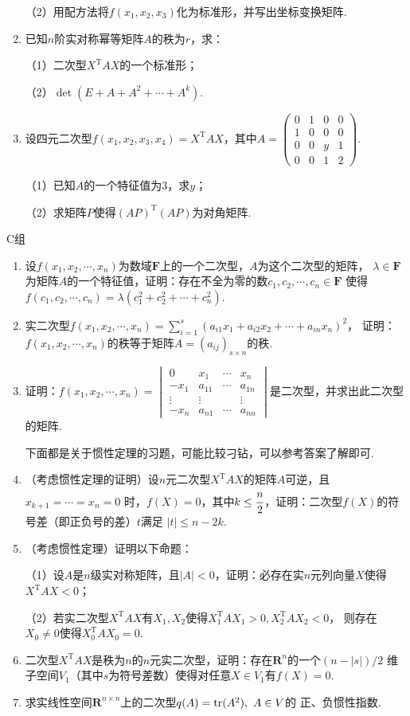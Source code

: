 \begin{enumerate}
	（2）用配方法将$f(x_1,x_2,x_3)$化为标准形，并写出坐标变换矩阵.
	\item 已知$n$阶实对称幂等矩阵$A$的秩为$r$，求：
	
	（1）二次型$X^\mathrm{T}AX$的一个标准形；

	（2）$\det(E+A+A^2+\cdots+A^k)$.
	\item 设四元二次型$f(x_1,x_2,x_3,x_4)=X^\mathrm{T}AX$，其中$A=\begin{pmatrix}
		0 & 1 & 0 & 0 \\ 1 & 0 & 0 & 0 \\ 0 & 0 & y & 1 \\ 0 & 0 & 1 & 2
	\end{pmatrix}$.

	（1）已知$A$的一个特征值为3，求$y$；

	（2）求矩阵$P$使得$(AP)^\mathrm{T}(AP)$为对角矩阵.
\end{enumerate}
\centerline{\heiti C组}

\begin{enumerate}
	\item 设$f(x_1,x_2,\cdots,x_n)$为数域$\mathbf{F}$上的一个二次型，$A$为这个二次型的矩阵，
	$\lambda\in\mathbf{F}$为矩阵$A$的一个特征值，证明：存在不全为零的数$c_1,c_2,\cdots,c_n\in\mathbf{F}$
	使得$f(c_1,c_2,\cdots,c_n)=\lambda(c_1^2+c_2^2+\cdots+c_n^2)$.
	\item 实二次型$f(x_1,x_2,\cdots,x_n)=\sum\limits_{i=1}^{s}(a_{i1}x_1+a_{i2}x_2+\cdots+a_{in}x_n)^2$，
	证明：$f(x_1,x_2,\cdots,x_n)$的秩等于矩阵$A=(a_{ij})_{s\times n}$的秩.
	\item 证明：$f(x_1,x_2,\cdots,x_n)=\begin{vmatrix}
		0 & x_1 & \cdots & x_n \\
		-x_1 & a_{11} & \cdots & a_{1n} \\
		\vdots & \vdots &  & \vdots \\
		-x_n & a_{n1} & \cdots & a_{nn}
	\end{vmatrix}$是二次型，并求出此二次型的矩阵.
	
	下面都是关于惯性定理的习题，可能比较刁钻，可以参考答案了解即可.
	\item （考虑惯性定理的证明）设$n$元二次型$X^\mathrm{T}AX$的矩阵$A$可逆，且$x_{k+1}=\cdots=x_n=0$
	时，$f(X)=0$，其中$k\le\cfrac{n}{2}$，证明：二次型$f(X)$的符号差（即正负号的差）$t$满足
	$|t|\le n-2k$.
	\item （考虑惯性定理）证明以下命题：
	
	（1）设$A$是$n$级实对称矩阵，且$|A|<0$，证明：必存在实$n$元列向量$X$使得$X^\mathrm{T}AX<0$；

	（2）若实二次型$X^\mathrm{T}AX$有$X_1,X_2$使得$X_1^\mathrm{T}AX_1>0,X_2^\mathrm{T}AX_2<0$，
	则存在$X_0\neq 0$使得$X_0^\mathrm{T}AX_0=0$.
	\item 二次型$X^\mathrm{T}AX$是秩为$n$的$n$元实二次型，证明：存在$\mathbf{R}^n$的一个$(n-|s|)/2$
	维子空间$V_1$（其中$s$为符号差数）使得对任意$X\in V_1$有$f(X)=0$.
	\item 求实线性空间$\mathbf{R}^{n\times n}$上的二次型$q(A)=\textup{tr}(A^2),\ A\in V$的
	正、负惯性指数.
\end{enumerate}